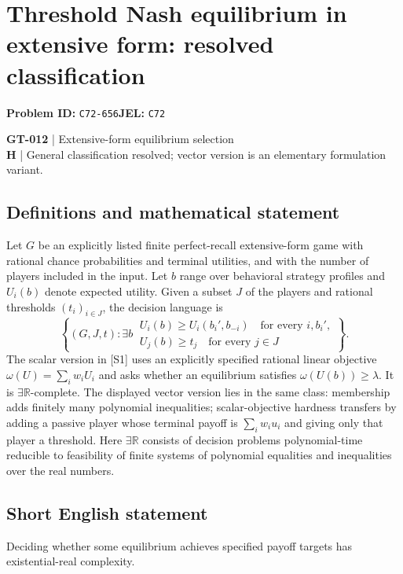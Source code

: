 \documentclass[11pt,a4paper]{article}
\begin{document}
\section*{Threshold Nash equilibrium in extensive form: resolved classification}
\textbf{Problem ID:} \texttt{C72-656}\quad \textbf{JEL:} \texttt{C72}\par
\label{problem:OP-0142}
\label{game:GT-012}
{\sffamily\small\color{muted}
\textbf{GT-012} | Extensive-form equilibrium selection\\
\textbf{H} | General classification resolved; vector version is an elementary formulation variant.
\par}
\subsection*{Definitions and mathematical statement}
Let $G$ be an explicitly listed finite perfect-recall extensive-form game with rational chance probabilities and terminal utilities, and with the number of players included in the input. Let $b$ range over behavioral strategy profiles and $U_i(b)$ denote expected utility. Given a subset $J$ of the players and rational thresholds $(t_i)_{i\in J}$, the decision language is
\[
 \left\{(G,J,t):\exists b\ 
 \begin{array}{l}
 U_i(b)\geq U_i(b_i',b_{-i})\quad\text{for every }i,b_i',\\
 U_j(b)\geq t_j\quad\text{for every }j\in J
 \end{array}\right\}.
\]
The scalar version in [S1] uses an explicitly specified rational linear objective $\omega(U)=\sum_iw_iU_i$ and asks whether an equilibrium satisfies $\omega(U(b))\geq\lambda$. It is $\exists\mathbb R$-complete. The displayed vector version lies in the same class: membership adds finitely many polynomial inequalities; scalar-objective hardness transfers by adding a passive player whose terminal payoff is $\sum_iw_iu_i$ and giving only that player a threshold.
Here $\exists\mathbb R$ consists of decision problems polynomial-time reducible to feasibility of finite systems of polynomial equalities and inequalities over the real numbers.
\subsection*{Short English statement}
Deciding whether some equilibrium achieves specified payoff targets has existential-real complexity.
\end{document}
